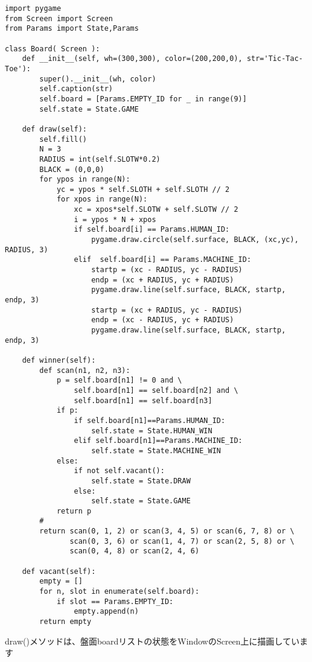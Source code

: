 \documentclass[uplatex,a4paper,11pt,oneside,openany]{jsbook}
\begin{document}
\begin{lstlisting}[caption=class Board,label=prog05-1]
import pygame
from Screen import Screen
from Params import State,Params

class Board( Screen ):
    def __init__(self, wh=(300,300), color=(200,200,0), str='Tic-Tac-Toe'):
        super().__init__(wh, color)
        self.caption(str)
        self.board = [Params.EMPTY_ID for _ in range(9)]
        self.state = State.GAME

    def draw(self):
        self.fill()
        N = 3
        RADIUS = int(self.SLOTW*0.2)
        BLACK = (0,0,0)
        for ypos in range(N):
            yc = ypos * self.SLOTH + self.SLOTH // 2
            for xpos in range(N):
                xc = xpos*self.SLOTW + self.SLOTW // 2
                i = ypos * N + xpos
                if self.board[i] == Params.HUMAN_ID:
                    pygame.draw.circle(self.surface, BLACK, (xc,yc), RADIUS, 3)
                elif  self.board[i] == Params.MACHINE_ID:
                    startp = (xc - RADIUS, yc - RADIUS)
                    endp = (xc + RADIUS, yc + RADIUS)
                    pygame.draw.line(self.surface, BLACK, startp, endp, 3)
                    startp = (xc + RADIUS, yc - RADIUS)
                    endp = (xc - RADIUS, yc + RADIUS)
                    pygame.draw.line(self.surface, BLACK, startp, endp, 3)

    def winner(self):
        def scan(n1, n2, n3):
            p = self.board[n1] != 0 and \
                self.board[n1] == self.board[n2] and \
                self.board[n1] == self.board[n3]
            if p:
                if self.board[n1]==Params.HUMAN_ID:
                    self.state = State.HUMAN_WIN
                elif self.board[n1]==Params.MACHINE_ID:
                    self.state = State.MACHINE_WIN
            else:
                if not self.vacant():
                    self.state = State.DRAW
                else:
                    self.state = State.GAME
            return p
        #
        return scan(0, 1, 2) or scan(3, 4, 5) or scan(6, 7, 8) or \
               scan(0, 3, 6) or scan(1, 4, 7) or scan(2, 5, 8) or \
               scan(0, 4, 8) or scan(2, 4, 6)

    def vacant(self):
        empty = []
        for n, slot in enumerate(self.board):
            if slot == Params.EMPTY_ID:
                empty.append(n)
        return empty
\end{lstlisting}%

draw()メソッドは、盤面boardリストの状態をWindowのScreen上に描画しています
\end{document}
